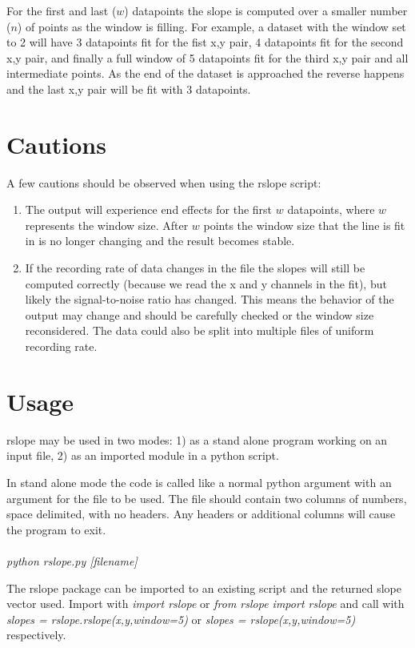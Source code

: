 \documentclass[a4paper,11pt,oneside]{article}
\begin{document}
For the first and last ($w$) datapoints the slope is computed over a smaller number ($n$) of points as the window is filling.  For example, a dataset with the window set to 2 will have 3 datapoints fit for the fist x,y pair, 4 datapoints fit for the second x,y pair, and finally a full window of 5 datapoints fit for the third x,y pair and all intermediate points.  As the end of the dataset is approached the reverse happens and the last x,y pair will be fit with 3 datapoints.

\section{Cautions}
A few cautions should be observed when using the rslope script:

\begin{enumerate}
\item The output will experience end effects for the first $w$ datapoints, where $w$ represents the window size.  After $w$ points the window size that the line is fit in is no longer changing and the result becomes stable.  
\item If the recording rate of data changes in the file the slopes will still be computed correctly (because we read the x and y channels in the fit), but likely the signal-to-noise ratio has changed.  This means the behavior of the output may change and should be carefully checked or the window size reconsidered.  The data could also be split into multiple files of uniform recording rate.
\end{enumerate}

\section{Usage}
rslope may be used in two modes: 1) as a stand alone program working on an input file, 2) as an imported  module in a python script.

In stand alone mode the code is called like a normal python argument with an argument for the file to be used.  The file should contain two columns of numbers, space delimited, with no headers.  Any headers or additional columns will cause the program to exit.\\\\ \emph{python rslope.py [filename]}

The rslope package can be imported to an existing script and the returned slope vector used.  Import with \emph{import rslope} or \emph{from rslope import rslope} and call with \emph{slopes = rslope.rslope(x,y,window=5)} or \emph{slopes = rslope(x,y,window=5)} respectively.  
\end{document}
